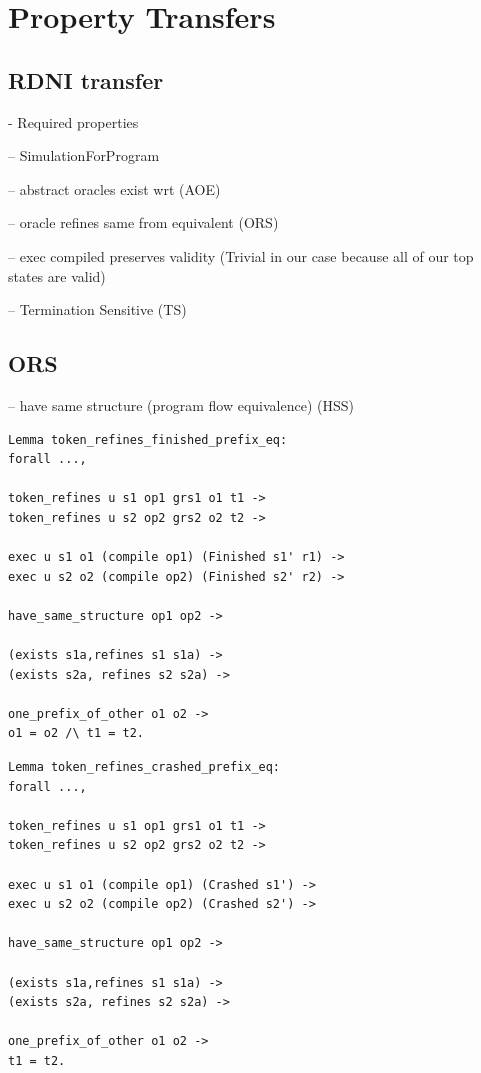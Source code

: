 \iffalse
\section{Property Transfers}

\subsection{RDNI transfer}
- Required properties

-- SimulationForProgram
    
-- abstract oracles exist wrt (AOE)

-- oracle refines same from equivalent (ORS)

-- exec compiled preserves validity (Trivial in our case because all of our top states are valid)

-- Termination Sensitive (TS)

\subsection{ORS}
-- have same structure (program flow equivalence) (HSS)

\begin{verbatim}
Lemma token_refines_finished_prefix_eq:
forall ...,

token_refines u s1 op1 grs1 o1 t1 ->
token_refines u s2 op2 grs2 o2 t2 ->

exec u s1 o1 (compile op1) (Finished s1' r1) ->
exec u s2 o2 (compile op2) (Finished s2' r2) ->

have_same_structure op1 op2 -> 

(exists s1a,refines s1 s1a) ->
(exists s2a, refines s2 s2a) ->

one_prefix_of_other o1 o2 ->
o1 = o2 /\ t1 = t2.
\end{verbatim}

\begin{verbatim}
Lemma token_refines_crashed_prefix_eq:
forall ...,

token_refines u s1 op1 grs1 o1 t1 ->
token_refines u s2 op2 grs2 o2 t2 ->

exec u s1 o1 (compile op1) (Crashed s1') ->
exec u s2 o2 (compile op2) (Crashed s2') ->

have_same_structure op1 op2 -> 

(exists s1a,refines s1 s1a) ->
(exists s2a, refines s2 s2a) ->

one_prefix_of_other o1 o2 ->
t1 = t2.
\end{verbatim}

